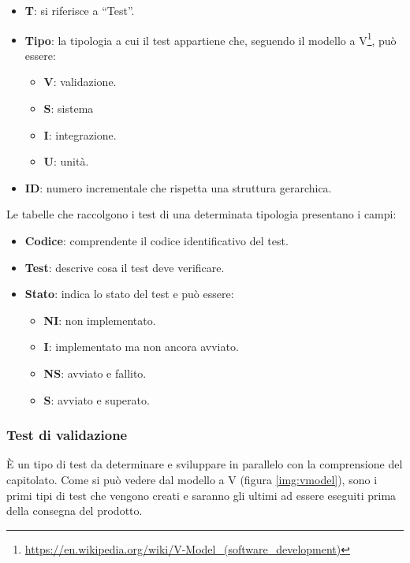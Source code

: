 \begin{itemize}
	\item \textbf{T}: si riferisce a ``Test''.
	\item \textbf{Tipo}: la tipologia a cui il test appartiene che, seguendo il modello a V\footnote{\url{https://en.wikipedia.org/wiki/V-Model_(software_development)}}, può essere:
	\begin{itemize}
		\item \textbf{V}: validazione. %
		\item \textbf{S}: sistema
		\item \textbf{I}: integrazione.
		\item \textbf{U}: unità.
		\end{itemize}
	\item \textbf{ID}: numero incrementale che rispetta una struttura gerarchica.
\end{itemize}

\newcommand{\TNI}{{\color{gray}\textbf{NI}}}
\newcommand{\TI}{{\color{blue}\textbf{I}}}
\newcommand{\TNS}{{\color{red}\textbf{NS}}}
\newcommand{\TS}{{\color{green}\textbf{S}}}

Le tabelle che raccolgono i test di una determinata tipologia presentano i campi:
\begin{itemize}
	\item \textbf{Codice}: comprendente il codice identificativo del test.
	\item \textbf{Test}: descrive cosa il test deve verificare.
	\item \textbf{Stato}: indica lo stato del test e può essere:
	\begin{itemize}
		\item \TNI: non implementato.
		\item \TI: implementato ma non ancora avviato.
		\item \TNS: avviato e fallito.
		\item \TS: avviato e superato.
	\end{itemize}
\end{itemize}

\subsubsection{Test di validazione} \label{testvalidazione}
È un tipo di test da determinare e sviluppare in parallelo con la comprensione del capitolato.
Come si può vedere dal modello a V (figura \ref{img:vmodel}), sono i primi tipi di test che vengono creati e saranno gli ultimi ad essere eseguiti prima della consegna del prodotto.

